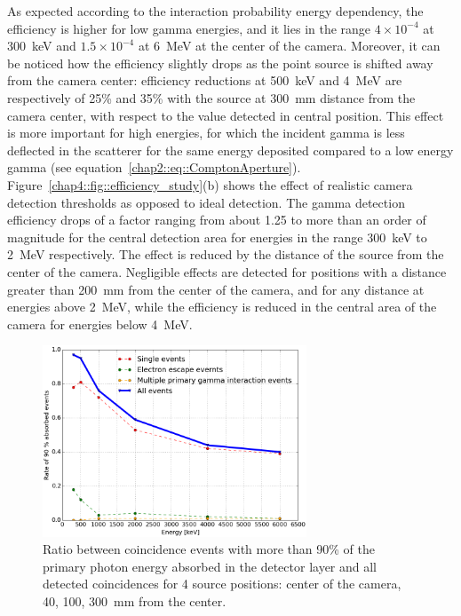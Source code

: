 As expected according to the interaction probability energy dependency, the efficiency is higher for low gamma energies, and it lies in the range $4\times10^{-4}$ at 300~keV and $1.5\times10^{-4}$ at 6~MeV at the center of the camera. Moreover, it can be noticed how the efficiency slightly drops as the point source is shifted away from the camera center: efficiency reductions at 500~keV and 4~MeV are respectively of 25\% and 35\% with the source at 300~mm distance from the camera center, with respect to the value detected in central position. This effect is more important for high energies, for which the incident gamma is less deflected in the scatterer for the same energy deposited compared to a low energy gamma (see equation~\ref{chap2::eq::ComptonAperture}).\\  
Figure~\ref{chap4::fig::efficiency_study}(b) shows the effect of realistic camera detection thresholds as opposed to ideal detection. The gamma detection efficiency drops of a factor ranging from about 1.25 to more than an order of magnitude for the central detection area for energies in the range 300~keV to 2~MeV respectively. The effect is reduced by the distance of the source from the center of the camera. Negligible effects are detected for positions with a distance greater than 200~mm from the center of the camera, and for any distance at energies above 2~MeV, while the efficiency is reduced in the central area of the camera for energies below 4~MeV.\\

\begin{figure} [!hbtp]	
\centering
\includegraphics[width=0.7\textwidth]{03_GraphicFiles/chapter4_HTsimu/new/90absFracVSenergy_hadronth.png}
\caption{Ratio between coincidence events with more than 90\% of the primary photon energy absorbed in the detector layer and all detected coincidences for 4 source positions: center of the camera, 40, 100, 300~mm from the center.}
\label{chap4::fig::rate_full_abs}
\end{figure}

